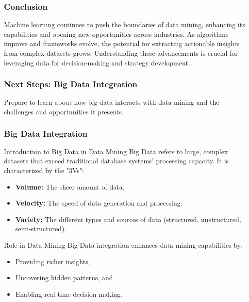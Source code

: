 \documentclass{beamer}
\begin{document}
\begin{frame}[fragile]
    \frametitle{Conclusion}
    Machine learning continues to push the boundaries of data mining, enhancing its capabilities and opening new opportunities across industries. As algorithms improve and frameworks evolve, the potential for extracting actionable insights from complex datasets grows. Understanding these advancements is crucial for leveraging data for decision-making and strategy development.
\end{frame}

\begin{frame}[fragile]
    \frametitle{Next Steps: Big Data Integration}
    Prepare to learn about how big data interacts with data mining and the challenges and opportunities it presents.
\end{frame}

\begin{frame}
    \frametitle{Big Data Integration}
    
    \begin{block}{Introduction to Big Data in Data Mining}
        Big Data refers to large, complex datasets that exceed traditional database systems' processing capacity. It is characterized by the "3Vs":
    \end{block}
    
    \begin{itemize}
        \item \textbf{Volume:} The sheer amount of data.
        \item \textbf{Velocity:} The speed of data generation and processing.
        \item \textbf{Variety:} The different types and sources of data (structured, unstructured, semi-structured).
    \end{itemize}
    
    \begin{block}{Role in Data Mining}
        Big Data integration enhances data mining capabilities by:
        \begin{itemize}
            \item Providing richer insights,
            \item Uncovering hidden patterns, and
            \item Enabling real-time decision-making.
        \end{itemize}
    \end{block}
\end{frame}
\end{document}
